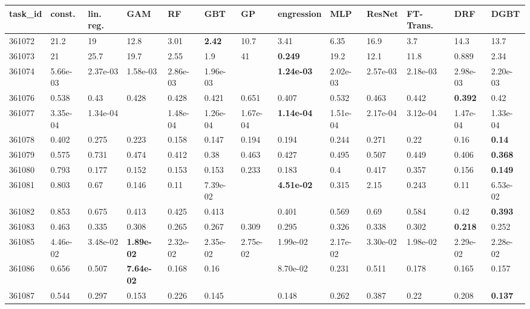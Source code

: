 \begin{table}[ht!]
\centering
\begingroup\footnotesize
\begin{tabular}{lllllllllllll}
  \hline
\hline
task\_id & const. & lin. reg. & GAM & RF & GBT & GP & engression & MLP & ResNet & FT-Trans. & DRF & DGBT \\ 
  \hline
361072 & 21.2 & 19 & 12.8 & 3.01 & \textbf{2.42} & 10.7 & 3.41 & 6.35 & 16.9 & 3.7 & 14.3 & 13.7 \\ 
  361073 & 21 & 25.7 & 19.7 & 2.55 & 1.9 & 41 & \textbf{0.249} & 19.2 & 12.1 & 11.8 & 0.889 & 2.34 \\ 
  361074 & 5.66e-03 & 2.37e-03 & 1.58e-03 & 2.86e-03 & 1.96e-03 &  & \textbf{1.24e-03} & 2.02e-03 & 2.57e-03 & 2.18e-03 & 2.98e-03 & 2.20e-03 \\ 
  361076 & 0.538 & 0.43 & 0.428 & 0.428 & 0.421 & 0.651 & 0.407 & 0.532 & 0.463 & 0.442 & \textbf{0.392} & 0.42 \\ 
  361077 & 3.35e-04 & 1.34e-04 &  & 1.48e-04 & 1.26e-04 & 1.67e-04 & \textbf{1.14e-04} & 1.51e-04 & 2.17e-04 & 3.12e-04 & 1.47e-04 & 1.33e-04 \\ 
  361078 & 0.402 & 0.275 & 0.223 & 0.158 & 0.147 & 0.194 & 0.194 & 0.244 & 0.271 & 0.22 & 0.16 & \textbf{0.14} \\ 
  361079 & 0.575 & 0.731 & 0.474 & 0.412 & 0.38 & 0.463 & 0.427 & 0.495 & 0.507 & 0.449 & 0.406 & \textbf{0.368} \\ 
  361080 & 0.793 & 0.177 & 0.152 & 0.153 & 0.153 & 0.233 & 0.183 & 0.4 & 0.417 & 0.357 & 0.156 & \textbf{0.149} \\ 
  361081 & 0.803 & 0.67 & 0.146 & 0.11 & 7.39e-02 &  & \textbf{4.51e-02} & 0.315 & 2.15 & 0.243 & 0.11 & 6.53e-02 \\ 
  361082 & 0.853 & 0.675 & 0.413 & 0.425 & 0.413 &  & 0.401 & 0.569 & 0.69 & 0.584 & 0.42 & \textbf{0.393} \\ 
  361083 & 0.463 & 0.335 & 0.308 & 0.265 & 0.267 & 0.309 & 0.295 & 0.326 & 0.338 & 0.302 & \textbf{0.218} & 0.252 \\ 
  361085 & 4.46e-02 & 3.48e-02 & \textbf{1.89e-02} & 2.32e-02 & 2.35e-02 & 2.75e-02 & 1.99e-02 & 2.17e-02 & 3.30e-02 & 1.98e-02 & 2.29e-02 & 2.28e-02 \\ 
  361086 & 0.656 & 0.507 & \textbf{7.64e-02} & 0.168 & 0.16 &  & 8.70e-02 & 0.231 & 0.511 & 0.178 & 0.165 & 0.157 \\ 
  361087 & 0.544 & 0.297 & 0.153 & 0.226 & 0.145 &  & 0.148 & 0.262 & 0.387 & 0.22 & 0.208 & \textbf{0.137} \\ 

\end{tabular}
\end{table}
